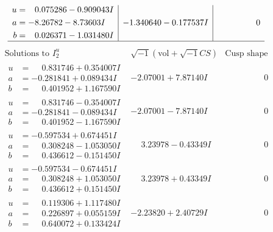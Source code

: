 \documentclass[1p]{elsarticle_modified}
\theoremstyle{definition}
\newcommand{\I}{\sqrt{-1}}
\begin{document}
$$\begin{array}{c|c|c}
\begin{aligned}
u &= \phantom{-}0.075286 - 0.909043 I \\
a &= -8.26782 - 8.73603 I \\
b &= \phantom{-}0.026371 - 1.031480 I\end{aligned}
 & -1.340640 - 0.177537 I & \phantom{-0.000000 } 0\\
 \hline 
 \end{array}$$\newpage$$\begin{array}{c|c|c}  
\text{Solutions to }I^u_{2}& \I (\text{vol} + \sqrt{-1}CS) & \text{Cusp shape}\\
 \hline 
\begin{aligned}
u &= \phantom{-}0.831746 + 0.354007 I \\
a &= -0.281841 + 0.089434 I \\
b &= \phantom{-}0.401952 + 1.167590 I\end{aligned}
 & -2.07001 + 7.87140 I & \phantom{-0.000000 } 0 \\ \hline\begin{aligned}
u &= \phantom{-}0.831746 - 0.354007 I \\
a &= -0.281841 - 0.089434 I \\
b &= \phantom{-}0.401952 - 1.167590 I\end{aligned}
 & -2.07001 - 7.87140 I & \phantom{-0.000000 } 0 \\ \hline\begin{aligned}
u &= -0.597534 + 0.674451 I \\
a &= \phantom{-}0.308248 - 1.053050 I \\
b &= \phantom{-}0.436612 - 0.151450 I\end{aligned}
 & \phantom{-}3.23978 - 0.43349 I & \phantom{-0.000000 } 0 \\ \hline\begin{aligned}
u &= -0.597534 - 0.674451 I \\
a &= \phantom{-}0.308248 + 1.053050 I \\
b &= \phantom{-}0.436612 + 0.151450 I\end{aligned}
 & \phantom{-}3.23978 + 0.43349 I & \phantom{-0.000000 } 0 \\ \hline\begin{aligned}
u &= \phantom{-}0.119306 + 1.117480 I \\
a &= \phantom{-}0.226897 + 0.055159 I \\
b &= \phantom{-}0.640072 + 0.133424 I\end{aligned}
 & -2.23820 + 2.40729 I & \phantom{-0.000000 } 0 \\ \hline\begin{aligned}

\end{aligned}
\end{array}$$
\end{document}
